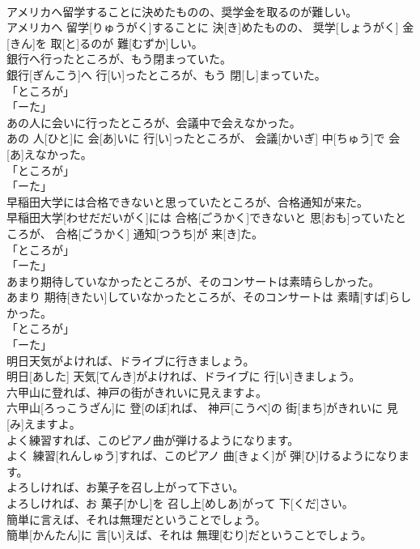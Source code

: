 \documentclass[8pt]{extreport}
\begin{document}
\begin{CJK}{UTF8}{min}
\\	アメリカへ留学することに決めたものの、奨学金を取るのが難しい。	
\\	アメリカへ 留学[りゅうがく]することに 決[き]めたものの、 奨学[しょうがく] 金[きん]を 取[と]るのが 難[むずか]しい。	
\\	銀行へ行ったところが、もう閉まっていた。	
\\	銀行[ぎんこう]へ 行[い]ったところが、もう 閉[し]まっていた。	
\\	「ところが」
\\	「ーた」
\\	あの人に会いに行ったところが、会議中で会えなかった。	
\\	あの 人[ひと]に 会[あ]いに 行[い]ったところが、 会議[かいぎ] 中[ちゅう]で 会[あ]えなかった。	
\\	「ところが」
\\	「ーた」
\\	早稲田大学には合格できないと思っていたところが、合格通知が来た。	
\\	早稲田大学[わせだだいがく]には 合格[ごうかく]できないと 思[おも]っていたところが、 合格[ごうかく] 通知[つうち]が 来[き]た。	
\\	「ところが」
\\	「ーた」
\\	あまり期待していなかったところが、そのコンサートは素晴らしかった。	
\\	あまり 期待[きたい]していなかったところが、そのコンサートは 素晴[すば]らしかった。	
\\	「ところが」
\\	「ーた」
\\	明日天気がよければ、ドライブに行きましょう。	
\\	明日[あした] 天気[てんき]がよければ、ドライブに 行[い]きましょう。	
\\	六甲山に登れば、神戸の街がきれいに見えますよ。	
\\	六甲山[ろっこうざん]に 登[のぼ]れば、 神戸[こうべ]の 街[まち]がきれいに 見[み]えますよ。	
\\	よく練習すれば、このピアノ曲が弾けるようになります。	
\\	よく 練習[れんしゅう]すれば、このピアノ 曲[きょく]が 弾[ひ]けるようになります。	
\\	よろしければ、お菓子を召し上がって下さい。	
\\	よろしければ、お 菓子[かし]を 召し上[めしあ]がって 下[くだ]さい。	
\\	簡単に言えば、それは無理だということでしょう。	
\\	簡単[かんたん]に 言[い]えば、それは 無理[むり]だということでしょう。	

\end{CJK}
\end{document}
